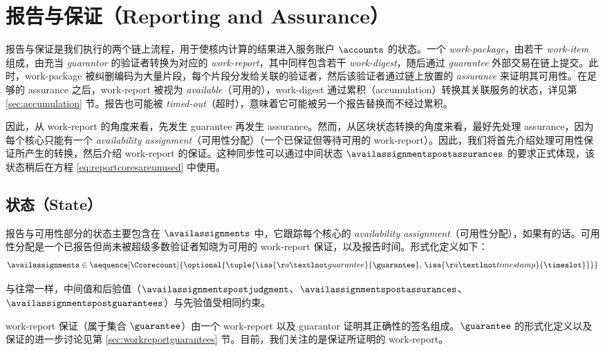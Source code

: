 \section{报告与保证（Reporting and Assurance）}
\label{sec:reporting}

报告与保证是我们执行的两个链上流程，用于使核内计算的结果进入服务账户 $\accounts$ 的状态。一个 \emph{work-package}，由若干 \emph{work-item} 组成，由充当 \emph{guarantor} 的验证者转换为对应的 \emph{work-report}，其中同样包含若干 \emph{work-digest}，随后通过 \emph{guarantee} 外部交易在链上提交。此时，work-package 被纠删编码为大量片段，每个片段分发给关联的验证者，然后该验证者通过链上放置的 \emph{assurance} 来证明其可用性。在足够的 assurance 之后，work-report 被视为 \emph{available}（可用的），work-digest 通过累积（accumulation）转换其关联服务的状态，详见第 \ref{sec:accumulation} 节。报告也可能被 \emph{timed-out}（超时），意味着它可能被另一个报告替换而不经过累积。

因此，从 work-report 的角度来看，先发生 guarantee 再发生 assurance。然而，从区块状态转换的角度来看，最好先处理 assurance，因为每个核心只能有一个 \emph{availability assignment}（可用性分配）（一个已保证但等待可用的 work-report）。因此，我们将首先介绍处理可用性保证所产生的转换，然后介绍 work-report 的保证。这种同步性可以通过中间状态 $\availassignmentspostassurances$ 的要求正式体现，该状态稍后在方程 \ref{eq:reportcoresareunused} 中使用。




\subsection{状态（State）}
报告与可用性部分的状态主要包含在 $\availassignments$ 中，它跟踪每个核心的 \emph{availability assignment}（可用性分配），如果有的话。可用性分配是一个已报告但尚未被超级多数验证者知晓为可用的 work-report 保证，以及报告时间。形式化定义如下：
\begin{equation}
  \label{eq:reportingstate}
  \availassignments \in \sequence[\Ccorecount]{
    \optional{\tuple{
      \isa{\aa¬guarantee}{\guarantee} ,\,
      \isa{\aa¬timestamp}{\timeslot}
    }}
  }
\end{equation}

与往常一样，中间值和后验值（$\availassignmentspostjudgment$、$\availassignmentspostassurances$、$\availassignmentspostguarantees$）与先验值受相同约束。

work-report 保证（属于集合 $\guarantee$）由一个 work-report 以及 guarantor 证明其正确性的签名组成。$\guarantee$ 的形式化定义以及保证的进一步讨论见第 \ref{sec:workreportguarantees} 节。目前，我们关注的是保证所证明的 work-report。

